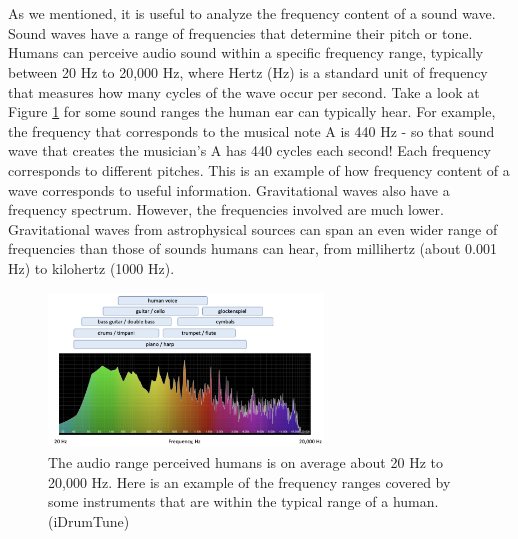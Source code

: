 \documentclass[14pt]{article}
\begin{document}
\\\\
\noindent As we mentioned, it is useful to analyze the frequency content of a sound wave. Sound waves have a range of frequencies that determine their pitch or tone. Humans can perceive audio sound within a specific frequency range, typically between 20 Hz to 20,000 Hz, where Hertz (Hz) is a standard unit of frequency that measures how many cycles of the wave occur per second. Take a look at Figure \ref{fig:freq_ear} for some sound ranges the human ear can typically hear. For example, the frequency that corresponds to the musical note A is 440 Hz - so that sound wave that creates the musician's A has 440 cycles each second! Each frequency corresponds to different pitches. This is an example of how frequency content of a wave corresponds to useful information. Gravitational waves also have a frequency spectrum. However, the frequencies involved are much lower. Gravitational waves from astrophysical sources can span an even wider range of frequencies than those of sounds humans can hear, from millihertz (about 0.001 Hz) to kilohertz (1000 Hz).


\begin{figure}[h]
    \centering
    \includegraphics[width=0.65\textwidth]{freq_spec.png}
    \caption{The audio range perceived humans is on average about 20 Hz to 20,000 Hz. Here is an example of the frequency ranges covered by some instruments that are within the typical range of a human. (iDrumTune)}
    \label{fig:freq_ear}
\end{figure}
\end{document}
